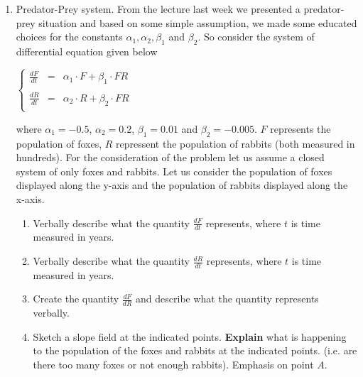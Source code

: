\documentclass[10pt,letterpaper]{article}
\begin{document}
\begin{enumerate}

\item Predator-Prey system.  From the lecture last week we presented a predator-prey situation and based on some simple assumption, we made some educated choices for the constants $\alpha_1, \alpha_2, \beta_1$ and $\beta_2$.  So consider the system of differential equation given below


$\displaystyle \left\{ \begin{array}{rcr}

 \frac{dF}{dt}&=& \alpha_1 \cdot F + \beta_1 \cdot FR  \\
& \\
 \frac{dR}{dt}&=& \alpha_2 \cdot R + \beta_2 \cdot FR\\ 
\end{array}
\right.$ 

where $\alpha_1= -0.5$, $\alpha_2 = 0.2$, $\beta_1 = 0.01$ and $\beta_2 = -0.005$.  $F$ represents the population of foxes, $R$ repressent the population of rabbits (both measured in hundreds).  For the consideration of the problem let us assume a closed system of only foxes and rabbits.  Let us consider the population of foxes displayed along the y-axis and the population of rabbits displayed along the x-axis.

  \begin{enumerate}
  
\item Verbally describe what the quantity $\displaystyle \frac{dF}{dt}$ represents, where $t$ is time measured in years.

\item Verbally describe what the quantity $\displaystyle \frac{dR}{dt}$ represents, where $t$ is time measured in years.

  \item Create the quantity $\displaystyle \frac{dF}{dR}$ and describe what the quantity represents verbally.
  
  
  \item Sketch a slope field at the indicated points.  \textbf{Explain} what is happening to the population of the foxes and rabbits at the indicated points.  (i.e. are there too many foxes or not enough rabbits).  Emphasis on point $A$.
  


\end{enumerate}
\end{enumerate}
\end{document}
